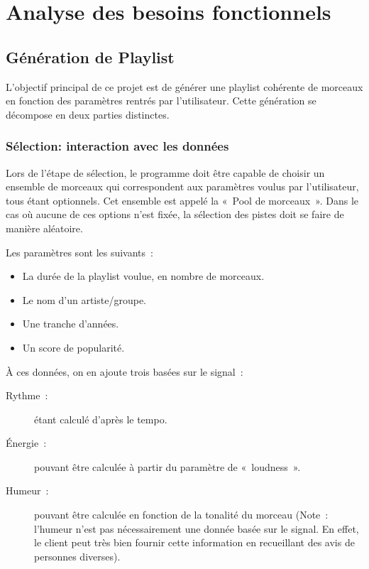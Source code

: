 \section{Analyse des besoins fonctionnels}
\label{besoins:fonc}

\subsection{Génération de Playlist}
\label{besoins:fonc:generation}

L’objectif principal de ce projet est de générer une playlist cohérente de 
morceaux en fonction des paramètres rentrés par l’utilisateur. Cette génération 
se décompose en deux parties distinctes.

\subsubsection{Sélection: interaction avec les données}
\label{besoins:fonc:generation:selection}

Lors de l’étape de sélection, le programme doit être capable de choisir un 
ensemble de morceaux qui correspondent aux paramètres voulus par l'utilisateur, 
tous étant optionnels. Cet ensemble est appelé la «~Pool de morceaux~». Dans le 
cas où aucune de ces options n’est fixée, la sélection des pistes doit se faire 
de manière aléatoire.

\vspace{3mm}
\noindent Les paramètres sont les suivants~:
\begin{itemize}
\item La durée de la playlist voulue, en nombre de morceaux.
\item Le nom d'un artiste/groupe.
\item Une tranche d'années.
\item Un score de popularité.
\end{itemize}

\vspace{3mm}
\noindent À ces données, on en ajoute trois basées sur le signal~:
\begin{description}
\item[Rythme~:] étant calculé d'après le tempo.
\item[Énergie~:] pouvant être calculée à partir du paramètre de «~loudness~».
\item[Humeur~:] pouvant être calculée en fonction de la tonalité du morceau 
(Note~: l’humeur n’est pas nécessairement une donnée basée sur le signal. En 
effet, le client peut très bien fournir cette information en recueillant des 
avis de personnes diverses).
\end{description}

